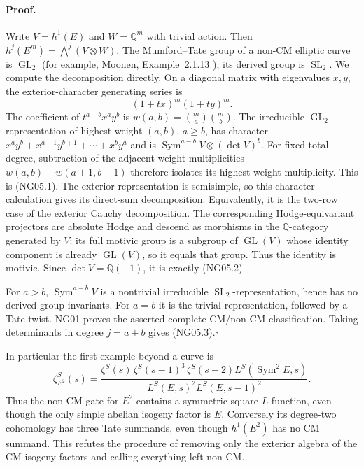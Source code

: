 \paragraph{Proof.}
Write $V=h^1(E)$ and $W=\mathbb Q^m$ with trivial action.
Then $h^j(E^m)=\bigwedge^j(V\otimes W)$.  The Mumford--Tate group
of a non-CM elliptic curve is $\operatorname{GL}_2$ (for example,
Moonen, Example~2.1.13 \cite{NGMoonen}); its derived group is $\operatorname{SL}_2$.
We compute the decomposition directly.  On a diagonal matrix with
eigenvalues $x,y$, the exterior-character generating series is
\[
                      (1+tx)^m(1+ty)^m.
\]
The coefficient of $t^{a+b}x^ay^b$ is
$w(a,b)=\binom ma\binom mb$.  The irreducible
$\operatorname{GL}_2$-representation of highest weight $(a,b)$,
$a\ge b$, has character
$x^ay^b+x^{a-1}y^{b+1}+\cdots+x^by^a$ and is
$\operatorname{Sym}^{a-b}V\otimes(\det V)^b$.
For fixed total degree, subtraction of the adjacent weight
multiplicities $w(a,b)-w(a+1,b-1)$ therefore isolates its highest-weight
multiplicity.  This is (NG05.1).  The exterior representation is
semisimple, so this character calculation gives its direct-sum
decomposition.  Equivalently, it is the two-row case of the exterior
Cauchy decomposition.  The corresponding Hodge-equivariant
projectors are absolute Hodge and descend as morphisms in the
$\mathbb Q$-category generated by $V$: its full motivic group is a
subgroup of $\operatorname{GL}(V)$ whose identity component is already
$\operatorname{GL}(V)$, so it equals that group.  Thus the identity is motivic.
Since $\det V=\mathbb Q(-1)$, it is exactly (NG05.2).

For $a>b$, $\operatorname{Sym}^{a-b}V$ is a nontrivial irreducible
$\operatorname{SL}_2$-representation, hence has no derived-group
invariants.  For $a=b$ it is the trivial representation, followed by
a Tate twist.  NG01 proves the asserted complete CM/non-CM
classification.  Taking determinants in degree $j=a+b$ gives
(NG05.3).\hfill$\square$

In particular the first example beyond a curve is
\[
 \zeta_{E^2}^S(s)=
 \frac{\zeta^S(s)\,\zeta^S(s-1)^3\,\zeta^S(s-2)
                        L^S(\operatorname{Sym}^2E,s)}
      {L^S(E,s)^2 L^S(E,s-1)^2}.                              \tag{NG05.4}
\]
Thus the non-CM gate for $E^2$ contains a symmetric-square
$L$-function, even though the only simple abelian isogeny factor is
$E$.  Conversely its degree-two cohomology has three Tate summands,
even though $h^1(E^2)$ has no CM summand.  This refutes the procedure
of removing only the exterior algebra of the CM isogeny factors and
calling everything left non-CM.

